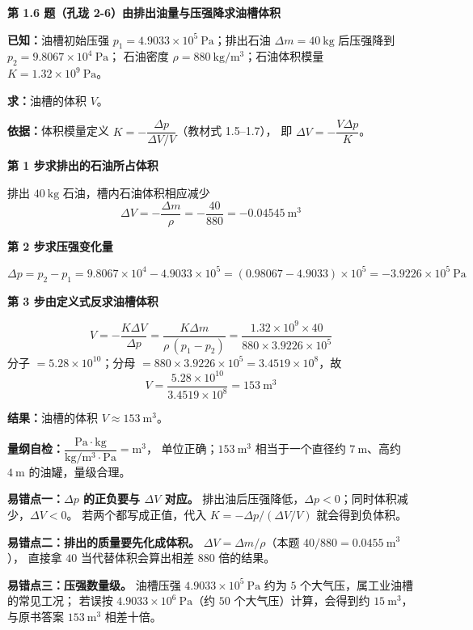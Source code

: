 \noindent\textbf{第 1.6 题（孔珑 2-6）\quad 由排出油量与压强降求油槽体积}

\begin{jie}
\textbf{已知：}油槽初始压强 $p_1=4.9033\times10^{5}\ \mathrm{Pa}$；排出石油
$\Delta m=40\ \mathrm{kg}$ 后压强降到 $p_2=9.8067\times10^{4}\ \mathrm{Pa}$；
石油密度 $\rho=880\ \mathrm{kg/m^3}$；石油体积模量 $K=1.32\times10^{9}\ \mathrm{Pa}$。

\textbf{求：}油槽的体积 $V$。

\textbf{依据：}体积模量定义 $K=-\dfrac{\Delta p}{\Delta V/V}$（教材式 1.5--1.7），
即 $\Delta V=-\dfrac{V\Delta p}{K}$。

\textbf{第 1 步\quad 求排出的石油所占体积}

排出 $40\ \mathrm{kg}$ 石油，槽内石油体积相应减少
\[ \Delta V=-\frac{\Delta m}{\rho}=-\frac{40}{880}=-0.04545\ \mathrm{m^3} \]

\textbf{第 2 步\quad 求压强变化量}

\[ \Delta p=p_2-p_1=9.8067\times10^{4}-4.9033\times10^{5}
        =(0.98067-4.9033)\times10^{5}=-3.9226\times10^{5}\ \mathrm{Pa} \]

\textbf{第 3 步\quad 由定义式反求油槽体积}

\[ V=-\frac{K\Delta V}{\Delta p}
     =\frac{K\Delta m}{\rho\,(p_1-p_2)}
     =\frac{1.32\times10^{9}\times40}{880\times3.9226\times10^{5}} \]
分子 $=5.28\times10^{10}$；分母 $=880\times3.9226\times10^{5}=3.4519\times10^{8}$，故
\[ V=\frac{5.28\times10^{10}}{3.4519\times10^{8}}=153\ \mathrm{m^3} \]

\textbf{结果：}油槽的体积 $V\approx153\ \mathrm{m^3}$。

\textbf{量纲自检：}$\dfrac{\mathrm{Pa\cdot kg}}{\mathrm{kg/m^3}\cdot\mathrm{Pa}}=\mathrm{m^3}$，
单位正确；$153\ \mathrm{m^3}$ 相当于一个直径约 $7\ \mathrm{m}$、高约 $4\ \mathrm{m}$ 的油罐，量级合理。
\end{jie}

\begin{yicuo}
\textbf{易错点一：$\Delta p$ 的正负要与 $\Delta V$ 对应。}
排出油后压强降低，$\Delta p<0$；同时体积减少，$\Delta V<0$。
若两个都写成正值，代入 $K=-\Delta p/(\Delta V/V)$ 就会得到负体积。

\textbf{易错点二：排出的质量要先化成体积。}
$\Delta V=\Delta m/\rho$（本题 $40/880=0.0455\ \mathrm{m^3}$），
直接拿 $40$ 当代替体积会算出相差 $880$ 倍的结果。

\textbf{易错点三：压强数量级。}
油槽压强 $4.9033\times10^{5}\ \mathrm{Pa}$ 约为 $5$ 个大气压，属工业油槽的常见工况；
若误按 $4.9033\times10^{6}\ \mathrm{Pa}$（约 $50$ 个大气压）计算，会得到约 $15\ \mathrm{m^3}$，
与原书答案 $153\ \mathrm{m^3}$ 相差十倍。
\end{yicuo}

